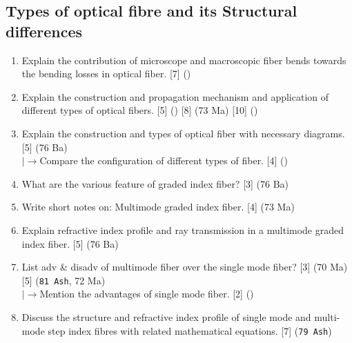 \documentclass[12pt]{article}
\newcommand{\lb}{\\$\left|\rightarrow\right.$}
\begin{document}
  \subsection{Types of optical fibre and its Structural differences}
    \begin{enumerate}
      \item Explain the contribution of microscope and macroscopic fiber bends towards the bending losses in optical fiber. \hfill [7] ()

      \item Explain the construction and propagation mechanism and application of different types of optical fibers. \hfill [5] () [8] (73 Ma) [10] ()

      \item Explain the construction and types of optical fiber with necessary diagrams. \hfill [5] (76 Ba)
        \lb Compare the configuration of different types of fiber. \hfill [4] ()
      
      \item What are the various feature of graded index fiber? \hfill [3] (76 Ba)

      \item Write short notes on: Multimode graded index fiber. \hfill [4] (73 Ma)

      \item Explain refractive index profile and ray transmission in a multimode graded index fiber. \hfill [5] (76 Ba)

      \item List adv \& disadv of multimode fiber over the single mode fiber? \hfill [3] (70 Ma) [5] (\texttt{81 Ash}, 72 Ma)
        \lb Mention the advantages of single mode fiber. \hfill [2] ()

      \item Discuss the structure and refractive index profile of single mode and multi-mode step index fibres with related mathematical equations. \hfill [7] (\texttt{79 Ash})
    \end{enumerate}
\end{document}
